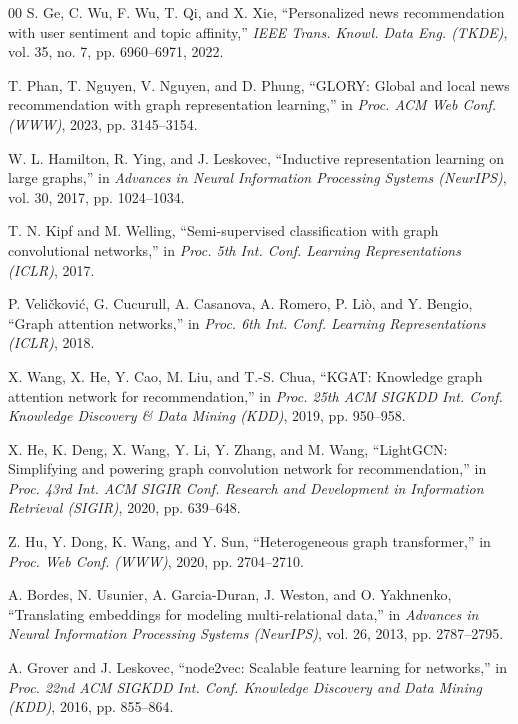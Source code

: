 \documentclass[conference]{IEEEtran}
\begin{document}
\begin{thebibliography}{00}
 S. Ge, C. Wu, F. Wu, T. Qi, and X. Xie, ``Personalized news recommendation with user sentiment and topic affinity,'' \emph{IEEE Trans. Knowl. Data Eng. (TKDE)}, vol. 35, no. 7, pp. 6960--6971, 2022.

 T. Phan, T. Nguyen, V. Nguyen, and D. Phung, ``GLORY: Global and local news recommendation with graph representation learning,'' in \emph{Proc. ACM Web Conf. (WWW)}, 2023, pp. 3145--3154.

 W. L. Hamilton, R. Ying, and J. Leskovec, ``Inductive representation learning on large graphs,'' in \emph{Advances in Neural Information Processing Systems (NeurIPS)}, vol. 30, 2017, pp. 1024--1034.

 T. N. Kipf and M. Welling, ``Semi-supervised classification with graph convolutional networks,'' in \emph{Proc. 5th Int. Conf. Learning Representations (ICLR)}, 2017.

 P. Veli\v{c}kovi\'{c}, G. Cucurull, A. Casanova, A. Romero, P. Li\`{o}, and Y. Bengio, ``Graph attention networks,'' in \emph{Proc. 6th Int. Conf. Learning Representations (ICLR)}, 2018.

 X. Wang, X. He, Y. Cao, M. Liu, and T.-S. Chua, ``KGAT: Knowledge graph attention network for recommendation,'' in \emph{Proc. 25th ACM SIGKDD Int. Conf. Knowledge Discovery \& Data Mining (KDD)}, 2019, pp. 950--958.

 X. He, K. Deng, X. Wang, Y. Li, Y. Zhang, and M. Wang, ``LightGCN: Simplifying and powering graph convolution network for recommendation,'' in \emph{Proc. 43rd Int. ACM SIGIR Conf. Research and Development in Information Retrieval (SIGIR)}, 2020, pp. 639--648.

 Z. Hu, Y. Dong, K. Wang, and Y. Sun, ``Heterogeneous graph transformer,'' in \emph{Proc. Web Conf. (WWW)}, 2020, pp. 2704--2710.

 A. Bordes, N. Usunier, A. Garcia-Duran, J. Weston, and O. Yakhnenko, ``Translating embeddings for modeling multi-relational data,'' in \emph{Advances in Neural Information Processing Systems (NeurIPS)}, vol. 26, 2013, pp. 2787--2795.

 A. Grover and J. Leskovec, ``node2vec: Scalable feature learning for networks,'' in \emph{Proc. 22nd ACM SIGKDD Int. Conf. Knowledge Discovery and Data Mining (KDD)}, 2016, pp. 855--864.


\end{thebibliography}
\end{document}
